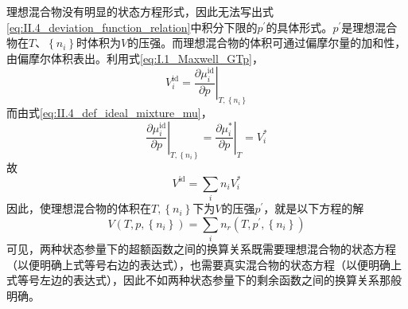 \documentclass[main.tex]{subfiles}
\begin{document}
理想混合物没有明显的状态方程形式，因此无法写出式\eqref{eq:II.4_deviation_function_relation}中积分下限的$p^\prime$的具体形式。$p^\prime$是理想混合物在$T$、$\left\{n_i\right\}$时体积为$V$的压强。而理想混合物的体积可通过偏摩尔量的加和性，由偏摩尔体积表出。利用式\eqref{eq:I.1_Maxwell_GTp}，
\[V_i^\text{id}=\left.\frac{\partial \mu_i^\text{id}}{\partial p}\right|_{T,\left\{n_i\right\}}\]
而由式\eqref{eq:II.4_def_ideal_mixture_mu}，
\[\left.\frac{\partial \mu_i^\text{id}}{\partial p}\right|_{T,\left\{n_i\right\}}=\left.\frac{\partial\mu^*_i}{\partial p}\right|_T=V_i^*\]
故
\[V^\text{id}=\sum_in_iV_i^*\]
因此，使理想混合物的体积在$T,\left\{n_i\right\}$下为$V$的压强$p^\prime$，就是以下方程的解
\[V\left(T,p,\left\{n_i\right\}\right)=\sum_in_r\left(T,p^\prime,\left\{n_i\right\}\right)\]
可见，两种状态参量下的超额函数之间的换算关系既需要理想混合物的状态方程（以便明确上式等号右边的表达式），也需要真实混合物的状态方程（以便明确上式等号左边的表达式），因此不如两种状态参量下的剩余函数之间的换算关系那般明确。
\end{document}
